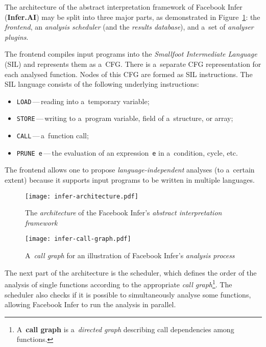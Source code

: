 The architecture of the abstract interpretation framework of Facebook Infer (\textbf{Infer.AI}) may be split into three major parts, as demonstrated in Figure~\ref{fig:inferArch}: the \emph{frontend}, an \emph{analysis scheduler} (and the \emph{results database}), and a~set of \emph{analyser plugins}.

The frontend compiles input programs into the \emph{Smallfoot Intermediate Language} (SIL) and represents them as a~CFG. There is a~separate CFG representation for each analysed function. Nodes of this CFG are formed as SIL instructions. The SIL language consists of the following underlying instructions:
\begin{itemize}
    \item \texttt{LOAD}\,---\,reading into a~temporary variable;

    \item \texttt{STORE}\,---\,writing to a~program variable, field of a~structure, or array;
    
    \item \texttt{CALL}\,---\,a~function call;

    \item \texttt{PRUNE~e}\,---\,the evaluation of an expression~\texttt{e} in a~condition, cycle, etc.
\end{itemize}
The frontend allows one to propose \emph{language-independent} analyses (to a~certain extent) because it supports input programs to be written in multiple languages.

\begin{figure}[hbt]
    \centering
    \texttt{[image: infer-architecture.pdf]}
    \caption{The \emph{architecture} of the Facebook Infer's \emph{abstract interpretation framework}~\cite{harmimBP}}
    \label{fig:inferArch}
\end{figure}

\begin{wrapfigure}{r}{.45 \linewidth}
    \centering
    \vspace{-1em}
    \texttt{[image: infer-call-graph.pdf]}
    \caption{A~\emph{call graph} for an illustration of Facebook Infer's \emph{analysis process}~\cite{harmimBP}}
    \vspace{-2em}
    \label{fig:inferCallGraph}
\end{wrapfigure}
The next part of the architecture is the scheduler, which defines the order of the analysis of single functions according to the appropriate \emph{call graph}\footnote{A~\textbf{call graph} is a~\emph{directed graph} describing call dependencies among functions.}. The scheduler also checks if it is possible to simultaneously analyse some functions, allowing Facebook Infer to run the analysis in parallel.

